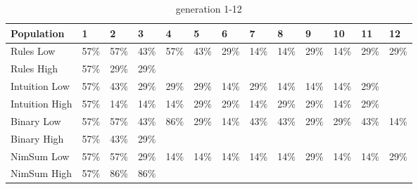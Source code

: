 \begin{table}
	\begin{subtable}{\linewidth}
	\centering
		\begin{tabular}{lllllllllllll}\hline
		Population & 1 & 2 & 3 & 4 & 5 & 6 & 7 & 8 & 9 & 10 & 11 & 12\\\hline
		Rules Low & 57\% & 57\% & 43\% & 57\% & 43\% & 29\% & 14\% & 14\% & 29\% & 14\% & 29\% & 29\% \\
		Rules High & 57\% & 29\% & 29\% & \textemdash & \textemdash & \textemdash & \textemdash & \textemdash & \textemdash & \textemdash & \textemdash & \textemdash \\
		Intuition Low & 57\% & 43\% & 29\% & 29\% & 29\% & 14\% & 29\% & 14\% & 14\% & 14\% & 29\% & \textemdash \\
		Intuition High & 57\% & 14\% & 14\% & 14\% & 29\% & 29\% & 14\% & 29\% & 29\% & 14\% & 29\% & \textemdash \\
		Binary Low & 57\% & 57\% & 43\% & 86\% & 29\% & 14\% & 43\% & 43\% & 29\% & 29\% & 43\% & 14\% \\
		Binary High & 57\% & 43\% & 29\% & \textemdash & \textemdash & \textemdash & \textemdash & \textemdash & \textemdash & \textemdash & \textemdash & \textemdash \\
		NimSum Low & 57\% & 57\% & 29\% & 14\% & 14\% & 14\% & 14\% & 14\% & 29\% & 14\% & 14\% & 29\% \\
		NimSum High & 57\% & 86\% & 86\% & \textemdash & \textemdash & \textemdash & \textemdash & \textemdash & \textemdash & \textemdash & \textemdash & \textemdash \\
		\end{tabular}
	\caption{generation 1-12}
	\end{subtable}


\end{table}
